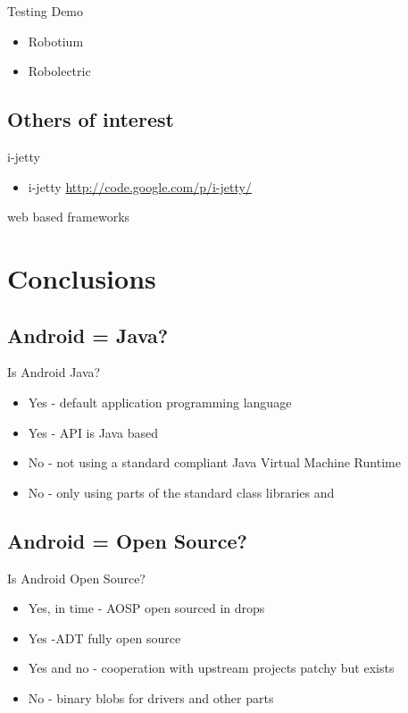 \documentclass[aspectratio=169]{beamer}
\newcommand{\surl}[1] {{\tiny \url{#1}}}
\begin{document}
    \begin{frame}{Testing Demo}
      \begin{itemize}
       \item Robotium
        \item Robolectric
      \end{itemize}

    \end{frame}



  \subsection{Others of interest}  

    \begin{frame}{i-jetty}
      \begin{itemize}
       \item i-jetty \surl{http://code.google.com/p/i-jetty/}
      \end{itemize}

    \end{frame}

    \begin{frame}{web based frameworks}
    \end{frame}

\section{Conclusions}

  \subsection{Android = Java?}
    \begin{frame}{Is Android Java?}
      \begin{itemize}
      \item<1-> Yes - default application programming language
      \item<2-> Yes - API is Java based
      \item<3-> No - not using a standard compliant Java Virtual Machine Runtime
      \item<4-> No - only using parts of the standard class libraries and 
      \end{itemize}
    \end{frame}

  \subsection{Android = Open Source?}
    \begin{frame}{Is Android Open Source?}
      \begin{itemize}
       \item<1-> Yes, in time - AOSP open sourced in drops
       \item<2-> Yes -ADT fully open source
       \item<3-> Yes and no - cooperation with upstream projects patchy but exists
       \item<4-> No - binary blobs for drivers and other parts
      \end{itemize}
    \end{frame}
\end{document}
